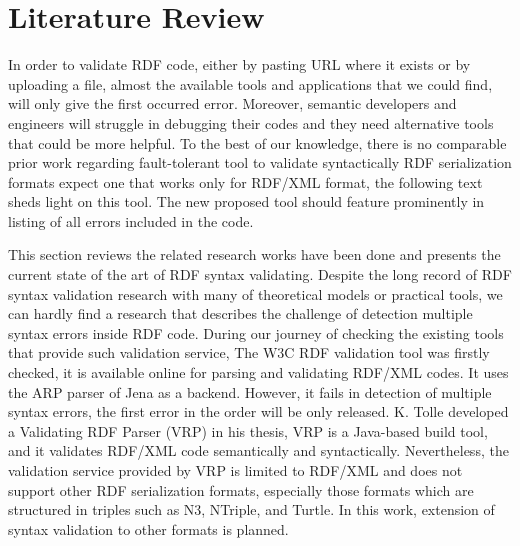 \section{Literature Review} \label{Sec:Review}
In order to validate RDF code, either by pasting URL where it exists or by uploading a file, almost the available tools and applications that we could find, will only give the first occurred error. Moreover, semantic developers and engineers will struggle in debugging their codes and they need alternative tools that could be more helpful. To the best of our knowledge, there is no comparable prior work regarding fault-tolerant tool to validate syntactically RDF serialization formats expect one that works only for RDF/XML format, the following text sheds light on this tool. The new proposed tool should feature prominently in listing of all errors included in the code.

This section reviews the related research works have been done and presents the current state of the art of RDF syntax validating. Despite the long record of RDF syntax validation research with many of theoretical models or practical tools, we can hardly find a research that describes the challenge of detection multiple syntax errors inside RDF code. During our journey of checking the existing tools that provide such validation service, The W3C RDF validation tool \citep{W3C:Validation:Online} was firstly checked, it is available online for parsing and validating RDF/XML codes. It uses the ARP parser of Jena \citep{McBride:2002:JSW:613357.613755} as a backend. However, it fails in detection of multiple syntax errors, the first error in the order will be only released. K. Tolle developed a Validating RDF Parser (VRP) \citep{karsten:Thesis:2000} in his thesis, VRP is a Java-based build tool, and it validates RDF/XML code semantically and syntactically. Nevertheless, the validation service provided by VRP is limited to RDF/XML and does not support other RDF serialization formats, especially those formats which are structured in triples such as N3, NTriple, and Turtle. In this work, extension of syntax validation to other formats is planned. 

